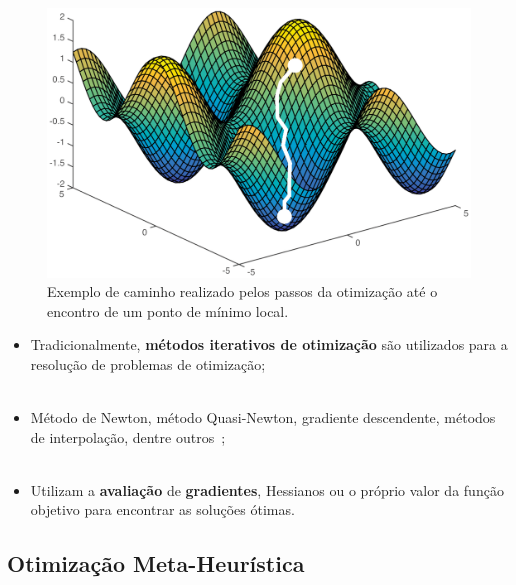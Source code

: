 \begin{frame}
	\begin{figure}
		\centering
		\includegraphics[scale=0.45]{figs/opt_function_opt.eps}	
		\caption{Exemplo de caminho realizado pelos passos da otimização até o encontro de um ponto de mínimo local.}
		\label{f.opt_function_opt}
	\end{figure}
\end{frame}

\begin{frame}
	\begin{itemize}
		\justifying
		\item Tradicionalmente, \textbf{métodos iterativos de otimização} são utilizados para a resolução de problemas de otimização;
		\\~\\
		\item Método de Newton, método Quasi-Newton, gradiente descendente, métodos de interpolação, dentre outros~\cite{Bertsekas:99};
		\\~\\
		\item Utilizam a \textbf{avaliação} de \textbf{gradientes}, Hessianos ou o próprio valor da função objetivo para encontrar as soluções ótimas.
	\end{itemize}
\end{frame}


\subsection{Otimização Meta-Heurística}
\label{ss.optimization_mh}

